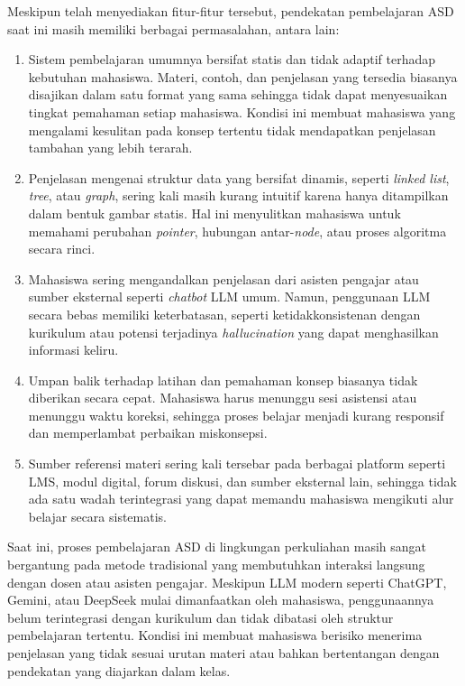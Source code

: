 Meskipun telah menyediakan fitur-fitur tersebut, pendekatan pembelajaran ASD saat ini masih memiliki berbagai permasalahan, antara lain:

\begin{enumerate}
    \item Sistem pembelajaran umumnya bersifat statis dan tidak adaptif terhadap kebutuhan mahasiswa. Materi, contoh, dan penjelasan yang tersedia biasanya disajikan dalam satu format yang sama sehingga tidak dapat menyesuaikan tingkat pemahaman setiap mahasiswa. Kondisi ini membuat mahasiswa yang mengalami kesulitan pada konsep tertentu tidak mendapatkan penjelasan tambahan yang lebih terarah.
    
    \item Penjelasan mengenai struktur data yang bersifat dinamis, seperti \textit{linked list}, \textit{tree}, atau \textit{graph}, sering kali masih kurang intuitif karena hanya ditampilkan dalam bentuk gambar statis. Hal ini menyulitkan mahasiswa untuk memahami perubahan \textit{pointer}, hubungan antar-\textit{node}, atau proses algoritma secara rinci.
    
    \item Mahasiswa sering mengandalkan penjelasan dari asisten pengajar atau sumber eksternal seperti \textit{chatbot} LLM umum. Namun, penggunaan LLM secara bebas memiliki keterbatasan, seperti ketidakkonsistenan dengan kurikulum atau potensi terjadinya \textit{hallucination} yang dapat menghasilkan informasi keliru.
    
    \item Umpan balik terhadap latihan dan pemahaman konsep biasanya tidak diberikan secara cepat. Mahasiswa harus menunggu sesi asistensi atau menunggu waktu koreksi, sehingga proses belajar menjadi kurang responsif dan memperlambat perbaikan miskonsepsi.
    
    \item Sumber referensi materi sering kali tersebar pada berbagai platform seperti LMS, modul digital, forum diskusi, dan sumber eksternal lain, sehingga tidak ada satu wadah terintegrasi yang dapat memandu mahasiswa mengikuti alur belajar secara sistematis.
\end{enumerate}

Saat ini, proses pembelajaran ASD di lingkungan perkuliahan masih sangat bergantung pada metode tradisional yang membutuhkan interaksi langsung dengan dosen atau asisten pengajar. Meskipun LLM modern seperti ChatGPT, Gemini, atau DeepSeek mulai dimanfaatkan oleh mahasiswa, penggunaannya belum terintegrasi dengan kurikulum dan tidak dibatasi oleh struktur pembelajaran tertentu. Kondisi ini membuat mahasiswa berisiko menerima penjelasan yang tidak sesuai urutan materi atau bahkan bertentangan dengan pendekatan yang diajarkan dalam kelas.


